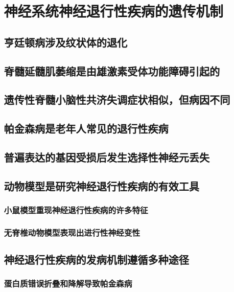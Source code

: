 \chapter{神经系统神经退行性疾病的遗传机制}

\section{亨廷顿病涉及纹状体的退化}

\section{脊髓延髓肌萎缩是由雄激素受体功能障碍引起的}

\section{遗传性脊髓小脑性共济失调症状相似，但病因不同}

\section{帕金森病是老年人常见的退行性疾病}

\section{普遍表达的基因受损后发生选择性神经元丢失}

\section{动物模型是研究神经退行性疾病的有效工具}
\subsection{小鼠模型重现神经退行性疾病的许多特征}
\subsection{无脊椎动物模型表现出进行性神经变性}

\section{神经退行性疾病的发病机制遵循多种途径}
\subsection{蛋白质错误折叠和降解导致帕金森病}
